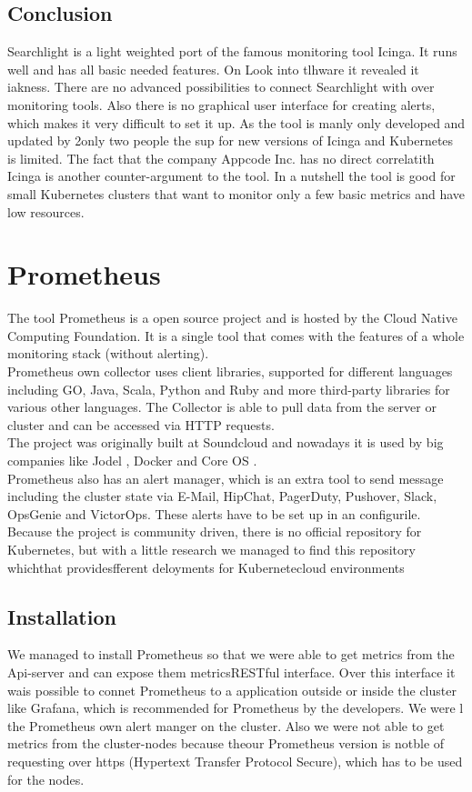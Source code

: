 \subsection{Conclusion}
Searchlight is a light weighted  port of the famous monitoring tool Icinga. It runs well and has all basic needed features. On Look  into tlhware  it revealed it iakness. There are no advanced possibilities to connect Searchlight with over monitoring tools. Also there is no graphical user interface for creating alerts, which makes it very difficult to set it up. As the tool is manly only developed and updated by 2only two people the sup for new versions of Icinga and Kubernetes is limited. The fact that the company Appcode Inc. has no direct correlatith Icinga is another counter-argument to the tool. In a nutshell the tool is good for small Kubernetes clusters that want to monitor only a few basic metrics and have low resources. 

\section{Prometheus}
\label{Prometheus} %
The tool Prometheus is a open source project and is hosted by the Cloud Native Computing Foundation.
It is a single tool that comes with the features of a whole monitoring stack (without alerting).\\ Prometheus own collector uses client libraries, supported for different languages including GO, Java, Scala, Python and Ruby and more third-party libraries for various other languages. The Collector is able to pull data from the server or cluster and can be accessed via HTTP requests.\\
The project was originally built at Soundcloud and nowadays it is used by big companies like Jodel \cite{jodel}, Docker and Core OS \cite{prometeus}. \\
Prometheus also has an alert manager, which is an extra tool to send message including the cluster state via E-Mail, HipChat, PagerDuty, Pushover, Slack, OpsGenie and VictorOps. These alerts have to be set up in an configurile. \\
Because the project is community driven, there is no official repository for Kubernetes, but with a little research we managed to find this repository \cite{prometheus_kube} whichthat providesfferent deloyments for Kubernetecloud environments
\subsection{Installation}
We managed to install Prometheus so that we were able to get metrics from the Api-server and can expose them metricsRESTful interface. Over this interface it wais possible to connet Prometheus to a application outside or inside the cluster like Grafana, which is recommended for Prometheus by the developers. We were l the Prometheus own alert manger on the cluster. Also we were not able to get metrics from the cluster-nodes because theour Prometheus version is notble of requesting over https (Hypertext Transfer Protocol Secure), which has to be used for the nodes. 
